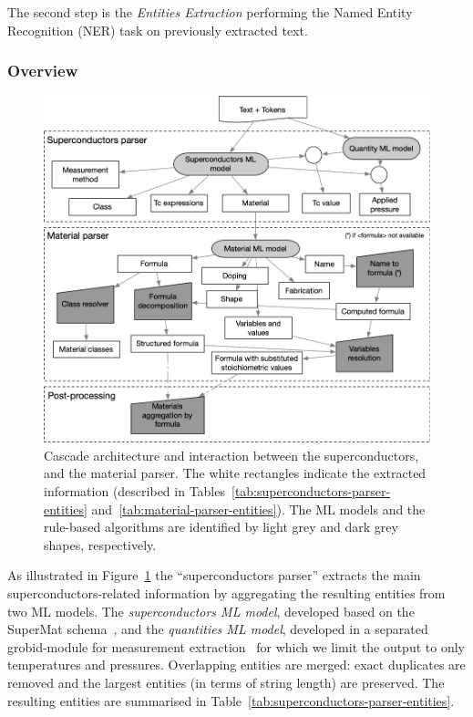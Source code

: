 \documentclass{article}
\begin{document}
The second step is the \textit{Entities Extraction} performing the Named Entity Recognition (NER) task on previously extracted text. 

\subsubsection{Overview}

\begin{figure}[ht]
\includegraphics[width=\textwidth]{extraction-schema-4}
\caption{\label{fig:extraction-ml-models-cascade-architecture} Cascade architecture and interaction between the superconductors, and the material parser. The white rectangles indicate the extracted information (described in Tables~\ref{tab:superconductors-parser-entities} and~\ref{tab:material-parser-entities}). 
The ML models and the rule-based algorithms are identified by light grey and dark grey shapes, respectively.}
\end{figure}

As illustrated in Figure~\ref{fig:extraction-ml-models-cascade-architecture} the ``superconductors parser'' extracts the main superconductors-related information by aggregating the resulting entities from two ML models. 
The \textit{superconductors ML model}, developed based on the SuperMat schema~\cite{foppiano2021supermat}, and the \textit{quantities ML model}, developed in a separated grobid-module for measurement extraction~\cite{foppiano2019quantities} for which we limit the output to only temperatures and pressures.
Overlapping entities are merged: exact duplicates are removed and the largest entities (in terms of string length) are preserved.
The resulting entities are summarised in Table~\ref{tab:superconductors-parser-entities}.
\end{document}
